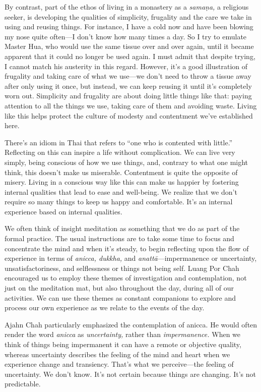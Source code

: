 By contrast, part of the ethos of living in a monastery as a 
\emph{samaṇa,} a religious seeker, is developing the qualities of 
simplicity, frugality and the care we take in using and reusing things. 
For instance, I have a cold now and have been blowing my nose quite 
often---I don't know how many times a day. So I try to emulate Master 
Hua, who would use the same tissue over and over again, until it became 
apparent that it could no longer be used again. I must admit that 
despite trying, I cannot match his austerity in this regard. However, 
it's a good illustration of frugality and taking care of what we 
use---we don't need to throw a tissue away after only using it once, 
but instead, we can keep reusing it until it's completely worn out. 
Simplicity and frugality are about doing little things like that: 
paying attention to all the things we use, taking care of them and 
avoiding waste. Living like this helps protect the culture of modesty 
and contentment we've established here.

There's an idiom in Thai that refers to ``one who is contented with 
little.'' Reflecting on this can inspire a life without complication. 
We can live very simply, being conscious of how we use things, and, 
contrary to what one might think, this doesn't make us miserable. 
Contentment is quite the opposite of misery. Living in a conscious way 
like this can make us happier by fostering internal qualities that lead 
to ease and well-being. We realize that we don't require so many things 
to keep us happy and comfortable. It's an internal experience based on 
internal qualities.


We often think of insight meditation as something that we do as part of 
the formal practice. The usual instructions are to take some time to 
focus and concentrate the mind and when it's steady, to begin 
reflecting upon the flow of experience in terms of \emph{anicca, 
dukkha,} and \emph{anattā}---impermanence or uncertainty, 
unsatisfactoriness, and selflessness or things not being self. Luang 
Por Chah encouraged us to employ these themes of investigation and 
contemplation, not just on the meditation mat, but also throughout the 
day, during all of our activities. We can use these themes as constant 
companions to explore and process our own experience as we relate to 
the events of the day.

Ajahn Chah particularly emphasized the contemplation of anicca. He 
would often render the word \emph{anicca} as \emph{uncertainty,} rather 
than \emph{impermanence.} When we think of things being impermanent it 
can have a remote or objective quality, whereas uncertainty describes 
the feeling of the mind and heart when we experience change and 
transiency. That's what we perceive---the feeling of uncertainty. We 
don't know. It's not certain because things are changing. It's not 
predictable.

